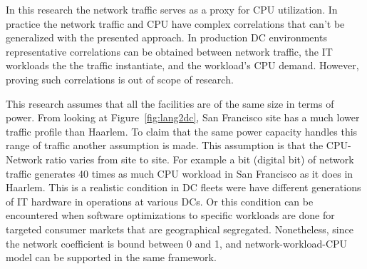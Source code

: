 In this research the network traffic serves as a proxy for CPU utilization. In practice the network traffic and CPU have complex correlations that can't be generalized with the presented approach. In production DC environments representative correlations can be obtained between network traffic, the IT workloads the the traffic instantiate, and the workload's CPU demand. However, proving such correlations is out of scope of research. 

This research assumes that all the facilities are of the same size in terms of power. From looking at Figure~\ref{fig:lang2dc}, San Francisco site has a much lower traffic profile than Haarlem. To claim that the same power capacity handles this range of traffic another assumption is made. This assumption is that the CPU-Network ratio varies from site to site. For example a bit (digital bit) of network traffic generates 40 times as much CPU workload in San Francisco as it does in Haarlem. This is a realistic condition in DC fleets were have different generations of IT hardware in operations at various DCs. Or this condition can be encountered when software optimizations to specific workloads are done for targeted consumer markets that are geographical segregated. Nonetheless, since the network coefficient is bound between 0 and 1, and network-workload-CPU model can be supported in the same framework. 

